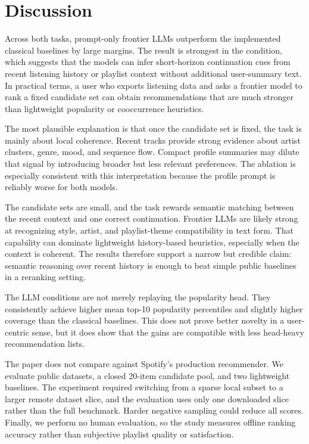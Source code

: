 \section{Discussion}
\label{sec:discussion}

 Across both tasks, prompt-only frontier LLMs outperform the implemented classical baselines by large margins. The result is strongest in the \minimalprompt condition, which suggests that the models can infer short-horizon continuation cues from recent listening history or playlist context without additional user-summary text. In practical terms, a user who exports listening data and asks a frontier model to rank a fixed candidate set can obtain recommendations that are much stronger than lightweight popularity or cooccurrence heuristics.

 The most plausible explanation is that once the candidate set is fixed, the task is mainly about local coherence. Recent tracks provide strong evidence about artist clusters, genre, mood, and sequence flow. Compact profile summaries may dilute that signal by introducing broader but less relevant preferences. The \mpd ablation is especially consistent with this interpretation because the profile prompt is reliably worse for both models.

 The candidate sets are small, and the task rewards semantic matching between the recent context and one correct continuation. Frontier LLMs are likely strong at recognizing style, artist, and playlist-theme compatibility in text form. That capability can dominate lightweight history-based heuristics, especially when the context is coherent. The results therefore support a narrow but credible claim: semantic reasoning over recent history is enough to beat simple public baselines in a reranking setting.

 The LLM conditions are not merely replaying the popularity head. They consistently achieve higher mean top-10 popularity percentiles and slightly higher coverage than the classical baselines. This does not prove better novelty in a user-centric sense, but it does show that the gains are compatible with less head-heavy recommendation lists.

 The paper does not compare against Spotify's production recommender. We evaluate public datasets, a closed 20-item candidate pool, and two lightweight baselines. The \lastfm experiment required switching from a sparse local subset to a larger remote dataset slice, and the \mpd evaluation uses only one downloaded slice rather than the full benchmark. Harder negative sampling could reduce all scores. Finally, we perform no human evaluation, so the study measures offline ranking accuracy rather than subjective playlist quality or satisfaction.

